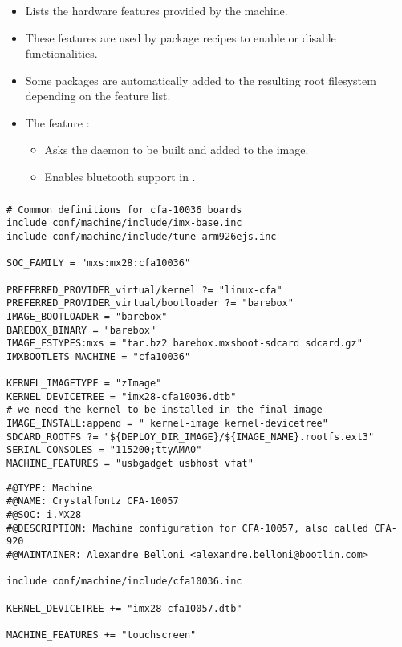 \begin{frame}
  \frametitle{}
  \begin{itemize}
    \item Lists the hardware features provided by the machine.
    \item These features are used by package recipes to enable or
      disable functionalities.
    \item Some packages are automatically added to the resulting root
    filesystem depending on the feature list.
    \item The feature :
      \begin{itemize}
        \item Asks the  daemon to be built and added to
          the image.
        \item Enables bluetooth support in .
      \end{itemize}
  \end{itemize}
\end{frame}

\begin{frame}[fragile]
  \frametitle{}
  \begin{block}{}
    \begin{verbatim}
# Common definitions for cfa-10036 boards
include conf/machine/include/imx-base.inc
include conf/machine/include/tune-arm926ejs.inc

SOC_FAMILY = "mxs:mx28:cfa10036"

PREFERRED_PROVIDER_virtual/kernel ?= "linux-cfa"
PREFERRED_PROVIDER_virtual/bootloader ?= "barebox"
IMAGE_BOOTLOADER = "barebox"
BAREBOX_BINARY = "barebox"
IMAGE_FSTYPES:mxs = "tar.bz2 barebox.mxsboot-sdcard sdcard.gz"
IMXBOOTLETS_MACHINE = "cfa10036"

KERNEL_IMAGETYPE = "zImage"
KERNEL_DEVICETREE = "imx28-cfa10036.dtb"
# we need the kernel to be installed in the final image
IMAGE_INSTALL:append = " kernel-image kernel-devicetree"
SDCARD_ROOTFS ?= "${DEPLOY_DIR_IMAGE}/${IMAGE_NAME}.rootfs.ext3"
SERIAL_CONSOLES = "115200;ttyAMA0"
MACHINE_FEATURES = "usbgadget usbhost vfat"
    \end{verbatim}
  \end{block}
\end{frame}

\begin{frame}[fragile]{}
  \begin{block}{}
    \begin{verbatim}
#@TYPE: Machine
#@NAME: Crystalfontz CFA-10057
#@SOC: i.MX28
#@DESCRIPTION: Machine configuration for CFA-10057, also called CFA-920
#@MAINTAINER: Alexandre Belloni <alexandre.belloni@bootlin.com>

include conf/machine/include/cfa10036.inc

KERNEL_DEVICETREE += "imx28-cfa10057.dtb"

MACHINE_FEATURES += "touchscreen"
    \end{verbatim}
  \end{block}
\end{frame}

